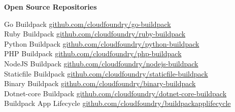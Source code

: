 \documentclass[10pt,a4papaer]{article}
\begin{document}
{\selectfont
	
	\begin{center}	
		{\huge\textbf{Open Source Repositories}} \\
	\end{center}
	
	Go Buildpack \href{https://github.com/cloudfoundry/go-buildpack}{github.com/cloudfoundry/go-buildpack}\\
	
	Ruby Buildpack \href{https://github.com/cloudfoundry/ruby-buildpack}{github.com/cloudfoundry/ruby-buildpack}\\
	
	Python Buildpack \href{https://github.com/cloudfoundry/python-buildpack}{github.com/cloudfoundry/python-buildpack}\\
	
	PHP Buildpack \href{https://github.com/cloudfoundry/php-buildpack}{github.com/cloudfoundry/php-buildpack}\\
	
	NodeJS Buildpack \href{https://github.com/cloudfoundry/nodejs-buildpack}{github.com/cloudfoundry/nodejs-buildpack}\\
	
	Staticfile Buildpack \href{https://github.com/cloudfoundry/staticfile-buildpack}{github.com/cloudfoundry/staticfile-buildpack}\\
	
	Binary Buildpack \href{https://github.com/cloudfoundry/binary-buildpack}{github.com/cloudfoundry/binary-buildpack}\\
	
	Dotnet-core Buildpack \href{https://github.com/cloudfoundry/dotnet-core-buildpack}{github.com/cloudfoundry/dotnet-core-buildpack}\\
	
	Buildpack App Lifecycle
	\href{https://github.com/cloudfoundry/buildpackapplifecycle}{github.com/cloudfoundry/buildpackapplifecycle}\\
	
}
\end{document}
